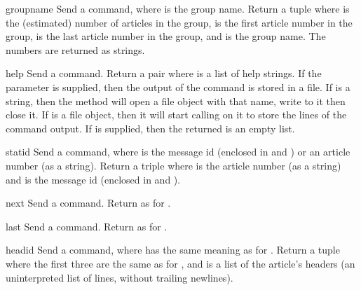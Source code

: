 \begin{methoddesc}{group}{name}
Send a  command, where  is the group name.
Return a tuple  where  is the (estimated) number
of articles in the group,  is the first article number in
the group,  is the last article number in the group, and
 is the group name.  The numbers are returned as strings.
\end{methoddesc}

\begin{methoddesc}{help}{}
Send a  command.  Return a pair  where  is a list of help strings.
If the  parameter is supplied, then the output of the 
 command is stored in a file.  If  is a string, 
then the method will open a file object with that name, write to it 
then close it.  If  is a file object, then it will start
calling  on it to store the lines of the command output.
If  is supplied, then the returned  is an empty list.
\end{methoddesc}

\begin{methoddesc}{stat}{id}
Send a  command, where  is the message id (enclosed
in \character{<} and \character{>}) or an article number (as a string).
Return a triple  where
 is the article number (as a string) and  is the
message id  (enclosed in \character{<} and \character{>}).
\end{methoddesc}

\begin{methoddesc}{next}{}
Send a  command.  Return as for .
\end{methoddesc}

\begin{methoddesc}{last}{}
Send a  command.  Return as for .
\end{methoddesc}

\begin{methoddesc}{head}{id}
Send a  command, where  has the same meaning as for
.  Return a tuple
where the first three are the same as for ,
and  is a list of the article's headers (an uninterpreted
list of lines, without trailing newlines).
\end{methoddesc}

